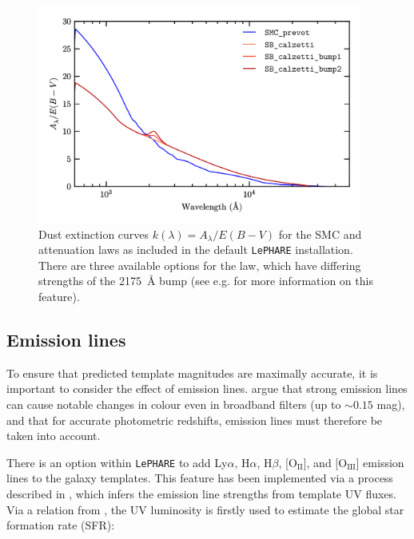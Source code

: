 \begin{figure}[h]
\centering
\includegraphics[width=0.95\textwidth]{lephare_extinction_plot.png}
\caption[Dust extinction curves]{Dust extinction curves $k(\lambda) = A_{\lambda} / E(B-V)$ for the SMC \citep{1984A&A...132..389P} and \cite{2000ApJ...533..682C} attenuation laws as included in the default \texttt{LePHARE} installation. There are three available options for the \cite{2000ApJ...533..682C} law, which have differing strengths of the \SI{2175}{\angstrom} bump (see e.g. \citealt{1965ApJ...142.1683S,1994ApJ...422..176M,2011ApJ...733...91X} for more information on this feature).}
\label{fig:extinction}
\end{figure}


\subsection{Emission lines}\label{subsection:emission_lines}
To ensure that predicted template magnitudes are maximally accurate, it is important to consider the effect of emission lines.  \cite{2009ApJ...690.1236I} argue that strong emission lines can cause notable changes in colour even in broadband filters (up to $\sim0.15$ mag), and that for accurate photometric redshifts, emission lines must therefore be taken into account. \par

There is an option within \texttt{LePHARE} to add Ly$\alpha$, H$\alpha$, H$\beta$, [$\mathrm{O_{II}}$], and [$\mathrm{O_{III}}$] emission lines to the galaxy templates. This feature has been implemented via a process described in \cite{2009ApJ...690.1236I}, which infers the emission line strengths from template UV fluxes. Via a relation from \cite{1998ARA&A..36..189K}, the UV luminosity is firstly used to estimate the global star formation rate (SFR):

